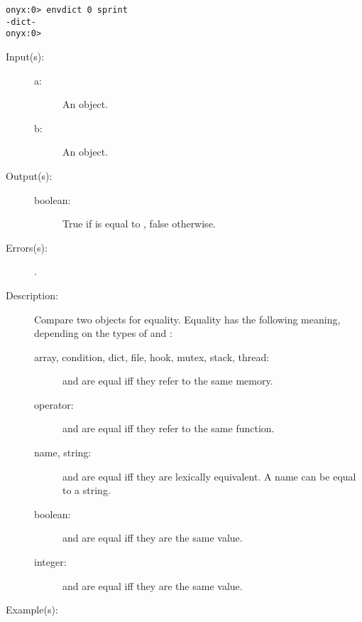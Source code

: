 \begin{description}
\begin{description}
\begin{verbatim}
onyx:0> envdict 0 sprint
-dict-
onyx:0>
		\end{verbatim}
	\end{description}
\label{systemdict:eq}
\item[{\onyxop{a b}{eq}{boolean}}: ]
	\begin{description}\item[]
	\item[Input(s): ]
		\begin{description}\item[]
		\item[a: ]
			An object.
		\item[b: ]
			An object.
		\end{description}
	\item[Output(s): ]
		\begin{description}\item[]
		\item[boolean: ]
			True if  is equal to , false
			otherwise.
		\end{description}
	\item[Errors(s): ]
		\begin{description}\item[]
		\item[.]
		\end{description}
	\item[Description: ]
		Compare two objects for equality.  Equality has the following
		meaning, depending on the types of  and :
		\begin{description}
		\item[array, condition, dict, file, hook, mutex, stack,
		thread: ]  and  are equal iff they refer to
		the same memory.
		\item[operator: ]  and  are equal iff they
		refer to the same function.
		\item[name, string: ]  and  are equal iff they
		are lexically equivalent.  A name can be equal to a string.
		\item[boolean: ]  and  are equal iff they
		are the same value.
		\item[integer: ]  and  are equal iff they
		are the same value.
		\end{description}
	\item[Example(s): ]\begin{verbatim}


\end{verbatim}
\end{description}
\end{description}
